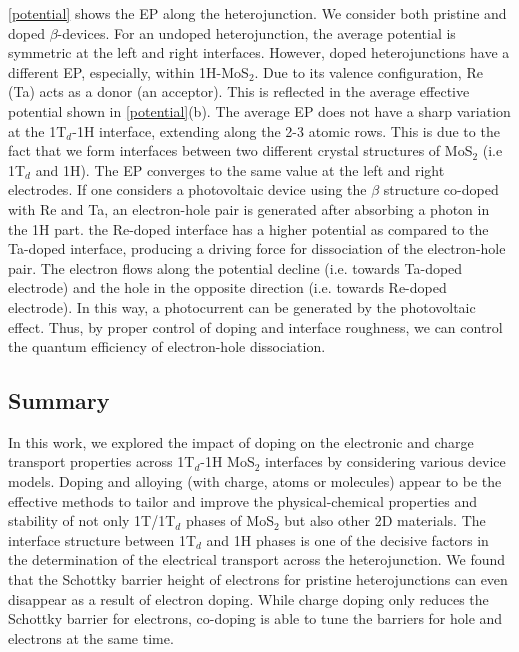 \autoref{potential} shows the EP along the heterojunction. We consider both pristine and doped $\beta$-devices. 
For an undoped heterojunction, the average potential is symmetric at the left and right interfaces.
However, doped heterojunctions have a  different EP, especially, within 1H-MoS$_2$. 
Due to its valence configuration, Re (Ta) acts as a donor (an acceptor). 
This is reflected in the average effective potential shown in \autoref{potential}(b).
The average EP does not have a sharp variation at the 1T$_d$-1H interface, extending along the 2-3 atomic rows.  
This is due to the fact that we form interfaces between two different crystal structures of MoS$_2$ (i.e 1T$_d$ and 1H). The EP converges to  the same value at the left and right electrodes. 
If one considers a photovoltaic device using the  $\beta$ structure co-doped with Re and Ta, 
an electron-hole pair is generated after absorbing a photon in the 1H part. 
the Re-doped interface has a higher potential as compared to the Ta-doped interface, producing a driving force for dissociation of the electron-hole pair. 
The electron flows along the potential decline (i.e. towards Ta-doped electrode)
and the hole in the opposite direction (i.e. towards Re-doped electrode).
In this way,  a photocurrent can be  generated by the photovoltaic effect. Thus, by proper control of doping and interface roughness, we 
can control the quantum efficiency of electron-hole dissociation\cite{doi:10.1021/acs.jpclett.7b00518}. 

\subsection{Summary}
In this work, we explored the impact of doping on the electronic and charge transport properties across 1T$_d$-1H MoS$_2$ interfaces by considering various device models. 
Doping and alloying (with charge, atoms or molecules) 
appear to be the effective methods to tailor and improve the physical-chemical properties and stability of not 
only 1T/1T$_d$ phases of MoS$_2$ but also other 2D materials. 
The interface structure between 1T$_d$ and 1H phases is one of the decisive factors in the determination of the electrical transport across the heterojunction. 
We found that the Schottky barrier height of electrons for  pristine heterojunctions  can even disappear as a result of electron doping. 
While charge doping only reduces the Schottky barrier for electrons, co-doping is able to tune the barriers for
hole and electrons at the same time.

